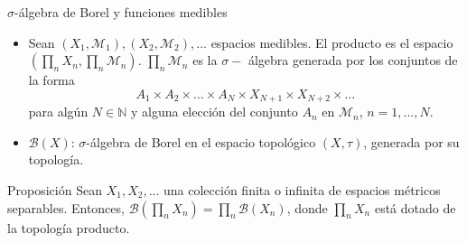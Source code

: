 \documentclass[8pt]{beamer}
\begin{document}
\begin{frame}{$\sigma$-álgebra de Borel y funciones medibles}
\begin{itemize}
    \item   Sean $(X_1,\mathcal{M}_1),(X_2,\mathcal{M}_2),...$ espacios medibles. El producto es el espacio $\left(\displaystyle \prod_n X_n,\prod_n \mathcal{M}_n\right)$. $\prod_n \mathcal{M}_n$ es la $\sigma-$ álgebra generada por los conjuntos de la forma 
\begin{equation*}
    A_1\times A_2 \times \dots \times A_N \times X_{N+1} \times X_{N+2} \times \dots
\end{equation*}
para algún $N \in \mathbb{N}$ y alguna elección del conjunto $A_n$ en $\mathcal{M}_n$, $n=1,...,N$. 
\pause
    \item $\mathcal{B}(X)$: $\sigma$-álgebra de Borel en el espacio topológico $(X, \tau)$, generada por su topología. 
    \pause
\end{itemize}

    \begin{block}{Proposición}
        Sean $X_1,X_2,...$ una colección finita o infinita de espacios métricos separables. Entonces, $\displaystyle \mathcal{B}\left(\prod_{n} X_n\right) = \prod_{n} \mathcal{B}(X_n)$, donde $\displaystyle \prod_n X_n$ está dotado de la topología producto. 
    \end{block}
\end{frame}
\end{document}
